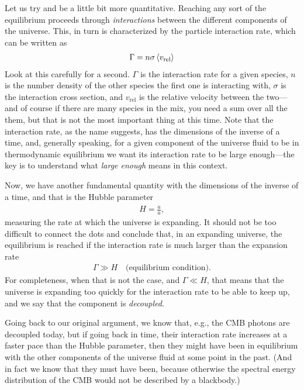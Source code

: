Let us try and be a little bit more quantitative. Reaching any sort of the equilibrium
proceeds through \emph{interactions} between the different components of the universe.
This, in turn is characterized by the particle interaction rate, which can be written as
\begin{align}
  \Gamma = n \sigma \left<v_\text{rel}\right>
\end{align}
Look at this carefully for a second. $\Gamma$ is the interaction rate for a given
species, $n$ is the number density of the other species the first one is interacting
with, $\sigma$ is the interaction cross section, and $v_\text{rel}$ is the relative
velocity between the two---and of course if there are many species in the mix, you
need a sum over all the them, but that is not the most important thing at this
time. Note that the interaction rate, as the name suggests, has the dimensions of
the inverse of a time, and, generally speaking, for a given component of the universe
fluid to be in thermodynamic equilibrium we want its interaction rate to be large
enough---the key is to understand what \emph{large enough} means in this context.

Now, we have another fundamental quantity with the dimensions of the inverse of a time,
and that is the Hubble parameter
\begin{align*}
  H = \frac{\dot{a}}{a},
\end{align*}
measuring the rate at which the universe is expanding. It should not be too difficult
to connect the dots and conclude that, in an expanding universe, the equilibrium
is reached if the interaction rate is much larger than the expansion rate
\begin{align}\label{eq:cosmo_equilibrium_condition}
  \Gamma \gg H \quad \text{(equilibrium condition)}.
\end{align}
For completeness, when that is not the case, and $\Gamma \ll H$, that means that
the universe is expanding too quickly for the interaction rate to be able to
keep up, and we say that the component is \emph{decoupled}.

Going back to our original argument, we know that, e.g., the CMB photons are decoupled
today, but if going back in time, their interaction rate increases at a faster pace
than the Hubble parameter, then they might have been in equilibrium with the other
components of the universe fluid at some point in the past. (And in fact we know
that they must have been, because otherwise the spectral energy distribution of
the CMB would not be described by a blackbody.)



